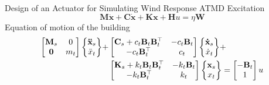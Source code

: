 \documentclass[usepdftitle=false]{beamer}
\newcommand{\matr}[1]{\mathbf{#1}}
\newenvironment{psmatrix}
  {\left\{\begin{matrix}}
  {\end{matrix}\right\}}
\begin{document}
\begin{frame}{Design of an Actuator for Simulating Wind Response}
ATMD Excitation
\begin{equation}\label{eq:6-10}
\matr{M}\matr{\ddot{x}}+\matr{C}\matr{\dot{x}}+\matr{K}\matr{x}+\matr{H}u = \eta\matr{W}
\end{equation}
Equation of motion of the building 
\begin{equation}\label{eq:6-11}
\begin{aligned}
\begin{bmatrix}\matr{M}_{s} & 0 \\ \matr{0} & m_{t}\end{bmatrix}
\begin{psmatrix}\matr{\ddot{x}}_{s} \\ \ddot{x}_{t}\end{psmatrix}+&
\begin{bmatrix}\matr{C}_{s}+c_{t}\matr{B}_{t}\matr{B}_{t}^{\top} & -c_{t}\matr{B}_{t} \\ -c_{t}\matr{B}_{t}^{\top} & c_{t}\end{bmatrix}
\begin{psmatrix}\matr{\dot{x}}_{s} \\ \dot{x}_{t}\end{psmatrix}+\\
&\begin{bmatrix}\matr{K}_{s}+k_{t}\matr{B}_{t}\matr{B}_{t}^{\top} & -k_{t}\matr{B}_{t} \\ -k_{t}\matr{B}_{t}^{\top} & k_{t}\end{bmatrix}
\begin{psmatrix}\matr{x}_{s} \\ x_{t}\end{psmatrix}  =
\begin{bmatrix}-\matr{B}_{t}\\1 \end{bmatrix}u
\end{aligned}
\end{equation}

\end{frame}
\end{document}
